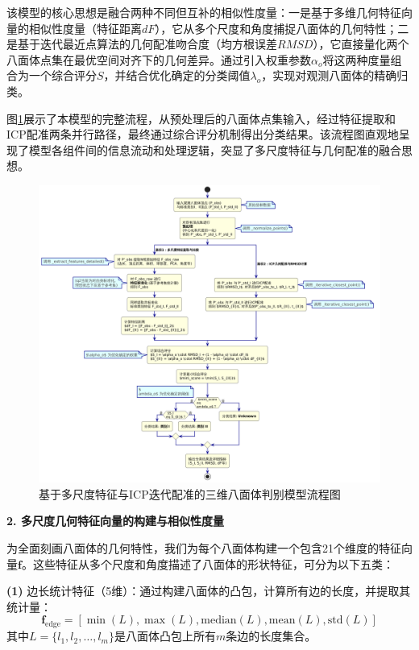 该模型的核心思想是融合两种不同但互补的相似性度量：一是基于多维几何特征向量的相似性度量（特征距离$dF$），它从多个尺度和角度捕捉八面体的几何特性；二是基于迭代最近点算法的几何配准吻合度（均方根误差$RMSD$），它直接量化两个八面体点集在最优空间对齐下的几何差异。通过引入权重参数$\alpha_o$将这两种度量组合为一个综合评分$S$，并结合优化确定的分类阈值$\lambda_o$，实现对观测八面体的精确归类。

图\ref{fig:octahedron_model_flowchart_q2}展示了本模型的完整流程，从预处理后的八面体点集输入，经过特征提取和ICP配准两条并行路径，最终通过综合评分机制得出分类结果。该流程图直观地呈现了模型各组件间的信息流动和处理逻辑，突显了多尺度特征与几何配准的融合思想。

\begin{figure}[H]
    \centering
     \includegraphics[width=1\textwidth]{figures2/model2.png}
    \caption{基于多尺度特征与ICP迭代配准的三维八面体判别模型流程图}
    \label{fig:octahedron_model_flowchart_q2}
\end{figure}

\textbf{2. 多尺度几何特征向量的构建与相似性度量}

为全面刻画八面体的几何特性，我们为每个八面体构建一个包含21个维度的特征向量$\mathbf{f}$。这些特征从多个尺度和角度描述了八面体的形状特征，可分为以下五类：

\textbf{(1)} 边长统计特征（5维）：通过构建八面体的凸包，计算所有边的长度，并提取其统计量：
\begin{equation}
\mathbf{f}_{\text{edge}} = [\min(L), \max(L), \text{median}(L), \text{mean}(L), \text{std}(L)]
\end{equation}
其中$L = \{l_1, l_2, \ldots, l_m\}$是八面体凸包上所有$m$条边的长度集合。

